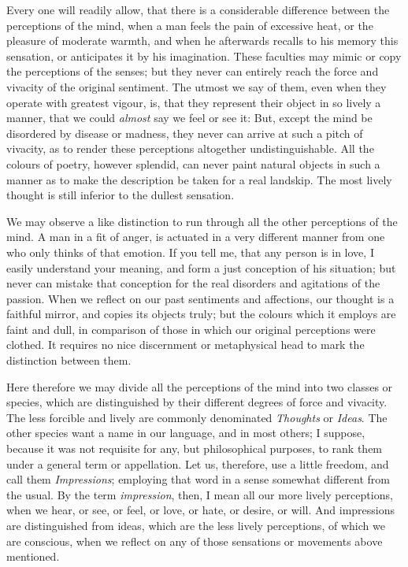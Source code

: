 \documentclass[]{article}
\begin{document}
\begin{sectionbody}

\humeparagraph  Every one will readily allow, that there is a considerable difference between the perceptions of the mind, when a man feels the pain of excessive heat, or the pleasure of moderate warmth, and when he afterwards recalls to his memory this sensation, or anticipates it by his imagination. These faculties may mimic or copy the perceptions of the senses; but they never can entirely reach the force and vivacity of the original sentiment. The utmost we say of them, even when they operate with greatest vigour, is, that they represent their object in so lively a manner, that we could \emph{almost} say we feel or see it: But, except the mind be disordered by disease or madness, they never can arrive at such a pitch of vivacity, as to render these perceptions altogether undistinguishable. All the colours of poetry, however splendid, can never paint natural objects in such a manner as to make the description be taken for a real landskip. The most lively thought is still inferior to the dullest sensation.

\humeparagraph  We may observe a like distinction to run through all the other perceptions of the mind. A man in a fit of anger, is actuated in a very different manner from one who only thinks of that emotion. If you tell me, that any person is in love, I easily understand your meaning, and form a just conception of his situation; but never can mistake that conception for the real disorders and agitations of the passion. When we reflect on our past sentiments and affections, our thought is a faithful mirror, and copies its objects truly; but the colours which it employs are faint and dull, in comparison of those in which our original perceptions were clothed. It requires no nice discernment or metaphysical head to mark the distinction between them.

\humeparagraph  Here therefore we may divide all the perceptions of the mind into two classes or species, which are distinguished by their different degrees of force and vivacity. The less forcible and lively are commonly denominated \emph{Thoughts} or \emph{Ideas}. The other species want a name in our language, and in most others; I suppose, because it was not requisite for any, but philosophical purposes, to rank them under a general term or appellation. Let us, therefore, use a little freedom, and call them \emph{Impressions}; employing that word in a sense somewhat different from the usual. By the term \emph{impression}, then, I mean all our more lively perceptions, when we hear, or see, or feel, or love, or hate, or desire, or will. And impressions are distinguished from ideas, which are the less lively perceptions, of which we are conscious, when we reflect on any of those sensations or movements above mentioned.


\end{sectionbody}
\end{document}
